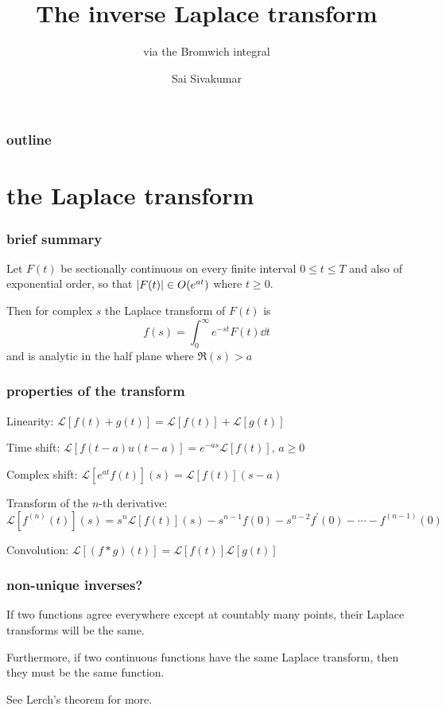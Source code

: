 \documentclass[mathserif]{beamer}
\title[The inverse Laplace transform] %
{The inverse Laplace transform}
\subtitle{via the Bromwich integral}
\author[Sai Sivakumar] %
{Sai Sivakumar}
\begin{document}
\frame{\titlepage}

\begin{frame}
\frametitle{outline}
\tableofcontents
\end{frame}

\section{the Laplace transform}

\begin{frame}
  \frametitle{brief summary}

  \begin{theorem}
    Let $F(t)$ be sectionally continuous on every finite interval $0\leq t\leq T$ and also of exponential order, so that $\abs{F(t)}\in O(e^{at})$ where $t\geq 0$.

    Then for complex $s$ the Laplace transform of $F(t)$ is \[f(s) = \int_0^\infty e^{-st}F(t)\dd{t}\] and is analytic in the half plane where $\Re(s) > a$
  \end{theorem}

\end{frame}

\begin{frame}
  \frametitle{properties of the transform}

  Linearity: $\mathcal{L}[f(t)+g(t)] = \mathcal{L}[f(t)] + \mathcal{L}[g(t)]$

  Time shift: $\mathcal{L}[f(t-a)u(t-a)] = e^{-as}\mathcal{L}[f(t)]$, $a\geq 0$

  Complex shift: $\mathcal{L}[e^{at}f(t)](s) = \mathcal{L}[f(t)](s-a)$

  Transform of the $n$-th derivative: $\mathcal{L}[f^{(n)}(t)](s) = s^n\mathcal{L}[f(t)](s) - s^{n-1}f(0) - s^{n-2}f^{\prime}(0) - \cdots - f^{(n-1)}(0)$

  Convolution: $\mathcal{L}[(f\ast g)(t)] = \mathcal{L}[f(t)]\mathcal{L}[g(t)]$
  
\end{frame}

\begin{frame}
  \frametitle{non-unique inverses?}

  If two functions agree everywhere except at countably many points, their Laplace transforms will be the same.

  Furthermore, if two continuous functions have the same Laplace transform, then they must be the same function.

  
  See Lerch's theorem for more.

\end{frame}
\end{document}
